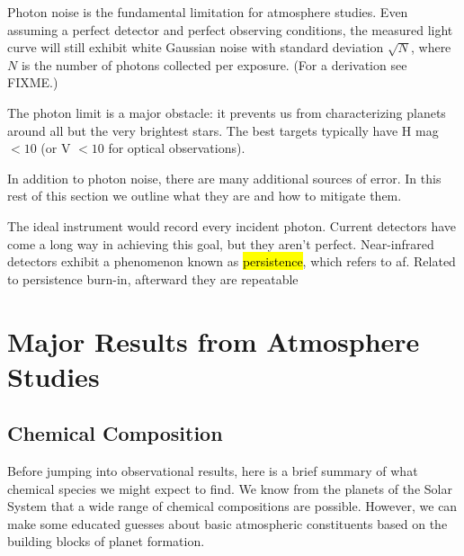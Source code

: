 \documentclass[graybox,natbib,nosecnum]{svmult}
\newcommand{\hbindex}[1]{\hl{#1}\index{#1}}  %
\begin{document}
Photon noise is the fundamental limitation for atmosphere studies. Even assuming a perfect detector and perfect observing conditions, the measured light curve will still exhibit white Gaussian noise with standard deviation $\sqrt{N}$, where $N$ is the number of photons collected per exposure. (For a derivation see FIXME.) 

The photon limit is a major obstacle: it prevents us from characterizing planets around all but the very brightest stars.  The best targets typically have H mag $< 10$ (or V $< 10$ for optical observations).  

In addition to photon noise, there are many additional sources of error. In this rest of this section we outline what they are and how to mitigate them. 

The ideal instrument would record every incident photon. Current detectors have come a long way in achieving this goal, but they aren't perfect. 
Near-infrared detectors exhibit a phenomenon known as \hbindex{persistence}, which refers to af. Related to persistence
burn-in, afterward they are repeatable


\runinhead{}
\runinhead{}


\section{Major Results from Atmosphere Studies}

\subsection{Chemical Composition}
Before jumping into observational results, here is a brief summary of what chemical species we might expect to find.  We know from the planets of the Solar System that a wide range of chemical compositions are possible. However, we can make some educated guesses about basic atmospheric constituents based on the building blocks of planet formation.
\end{document}
